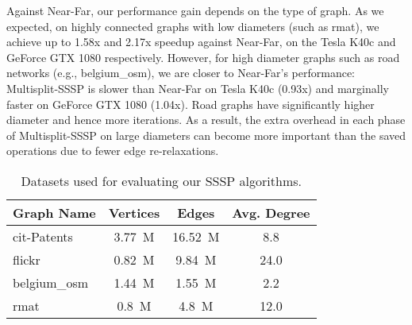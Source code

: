 Against Near-Far, our performance gain depends on the type of graph.
As we expected, on highly connected graphs with low diameters (such as rmat), we achieve up to 1.58x and 2.17x speedup against Near-Far, on the Tesla K40c and GeForce GTX 1080 respectively.
However, for high diameter graphs such as road networks (e.g., belgium\_osm), we are closer to Near-Far's performance: Multisplit-SSSP is slower than Near-Far on Tesla K40c (0.93x) and marginally faster on GeForce GTX 1080 (1.04x).
Road graphs have significantly higher diameter and hence more iterations. As a result, the extra overhead in each phase of Multisplit-SSSP on large diameters can become more important than the saved operations due to fewer edge re-relaxations.

\begin{table}
\centering
\scriptsize
\begin{tabular}{lccc}
\toprule
Graph Name & Vertices & Edges & Avg. Degree  \\
\midrule
cit-Patents~\cite{Hall:2001:NPC} & 3.77~M & 16.52~M & 8.8  \\
flickr~\cite{Davis:2011:UOF}  & 0.82~M & 9.84~M & 24.0 \\
belgium\_osm~\cite{Kobitzsh:2010:DIMACS}  & 1.44~M & 1.55~M & 2.2  \\
rmat~\cite{Chakrabarti:2004:RAR} & 0.8~M & 4.8~M & 12.0 \\
\bottomrule
\end{tabular}
\caption{Datasets used for evaluating our SSSP algorithms.}\label{table:graphs}
\end{table}

